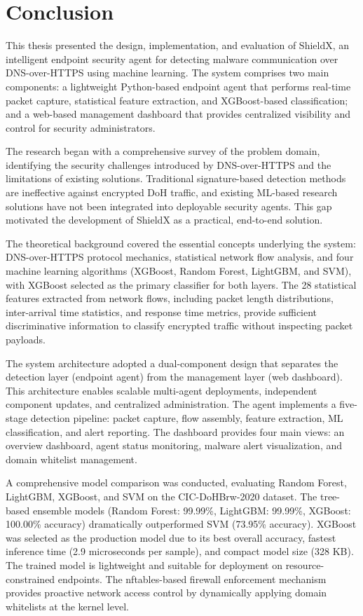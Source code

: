 \documentclass[../Main.tex]{subfiles}
\begin{document}
\section{Conclusion}

This thesis presented the design, implementation, and evaluation of ShieldX, an intelligent endpoint security agent for detecting malware communication over DNS-over-HTTPS using machine learning. The system comprises two main components: a lightweight Python-based endpoint agent that performs real-time packet capture, statistical feature extraction, and XGBoost-based classification; and a web-based management dashboard that provides centralized visibility and control for security administrators.

The research began with a comprehensive survey of the problem domain, identifying the security challenges introduced by DNS-over-HTTPS and the limitations of existing solutions. Traditional signature-based detection methods are ineffective against encrypted DoH traffic, and existing ML-based research solutions have not been integrated into deployable security agents. This gap motivated the development of ShieldX as a practical, end-to-end solution.

The theoretical background covered the essential concepts underlying the system: DNS-over-HTTPS protocol mechanics, statistical network flow analysis, and four machine learning algorithms (XGBoost, Random Forest, LightGBM, and SVM), with XGBoost selected as the primary classifier for both layers. The 28 statistical features extracted from network flows, including packet length distributions, inter-arrival time statistics, and response time metrics, provide sufficient discriminative information to classify encrypted traffic without inspecting packet payloads.

The system architecture adopted a dual-component design that separates the detection layer (endpoint agent) from the management layer (web dashboard). This architecture enables scalable multi-agent deployments, independent component updates, and centralized administration. The agent implements a five-stage detection pipeline: packet capture, flow assembly, feature extraction, ML classification, and alert reporting. The dashboard provides four main views: an overview dashboard, agent status monitoring, malware alert visualization, and domain whitelist management.

A comprehensive model comparison was conducted, evaluating Random Forest, LightGBM, XGBoost, and SVM on the CIC-DoHBrw-2020 dataset. The tree-based ensemble models (Random Forest: 99.99\%, LightGBM: 99.99\%, XGBoost: 100.00\% accuracy) dramatically outperformed SVM (73.95\% accuracy). XGBoost was selected as the production model due to its best overall accuracy, fastest inference time (2.9 microseconds per sample), and compact model size (328 KB). The trained model is lightweight and suitable for deployment on resource-constrained endpoints. The nftables-based firewall enforcement mechanism provides proactive network access control by dynamically applying domain whitelists at the kernel level.
\end{document}
